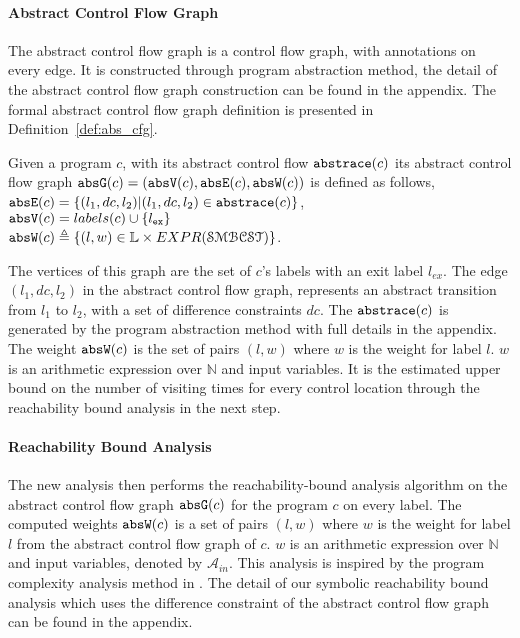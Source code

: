 \paragraph*{Abstract Control Flow Graph}
The abstract control flow graph is a control flow graph, with annotations on every edge. 
It is constructed through program abstraction method,
the detail of the abstract control flow graph construction can be found in the appendix.
The formal abstract control flow graph definition is presented in
Definition~\ref{def:abs_cfg}.
\begin{defn}
\label{def:abs_cfg}
Given a program $c$, 
with its abstract control flow $\mathtt{abs}{\mathtt{trace}}(c)$
its abstract control flow graph $\mathtt{abs}{\mathtt{G}}(c) =(\mathtt{abs}{\mathtt{V}}(c), \mathtt{abs}{\mathtt{E}}(c), \mathtt{abs}{\mathtt{W}}(c))$ is defined as follows,
\\
%
$\mathtt{abs}{\mathtt{E}}(c) = \{(l_1, dc, l_2) | (l_1, dc, l_2) \in \mathtt{abs}{\mathtt{trace}}(c)\}$,
\\
$\mathtt{abs}{\mathtt{V}}(c) = labels(c)\cup\{l_{\mathtt{ex}}\}$
\\
 $\absW(c) 
\triangleq \left\{ (l, w) \in \mathbb{L} \times EXPR(\constdom) \right\}$.
\end{defn}
%
The vertices of this graph are the set of $c$'s labels with an exit label $l_{ex}$.
The edge $(l_1, dc, l_2)$ in the abstract control flow graph, represents an abstract transition 
from $l_1$ to $l_2$, with a set of difference constraints $dc$. The $\mathtt{abs}{\mathtt{trace}}(c)$ is generated by the
program abstraction method with full details in the appendix.
The weight $\mathtt{abs}{\mathtt{W}}(c)$ is the set of pairs $(l,w)$ where $w$ is the weight for label $l$. 
$w$ is an arithmetic expression over $\mathbb{N}$ and input variables.
It is the estimated upper bound on the number of visiting times for every control location
through the reachability bound analysis in the next step.

\paragraph{Reachability Bound Analysis}
The new analysis then performs the reachability-bound analysis algorithm on the abstract control flow graph $\mathtt{abs}{\mathtt{G}}(c)$ for the program
$c$ on every label.
The computed weights $\mathtt{abs}{\mathtt{W}}(c)$ is
a set of pairs 
$(l, w)$ where 
$w$ is the weight 
for label $l$ from the abstract control flow graph of $c$.
$w$ is an arithmetic expression over $\mathbb{N}$ and
input variables, denoted by $\mathcal{A}_{in}$.
This analysis is inspired by the program complexity analysis method in \cite{sinn2017complexity}.
The detail of our symbolic reachability bound analysis which uses the difference constraint of the abstract control flow graph can be found in the appendix.

